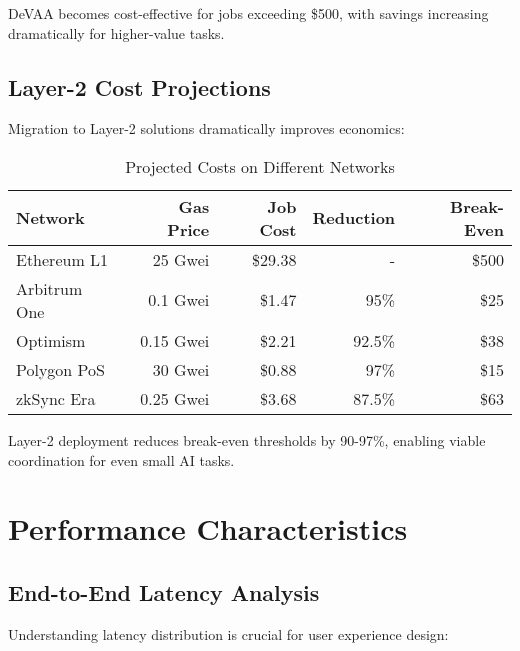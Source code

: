 DeVAA becomes cost-effective for jobs exceeding \$500, with savings increasing dramatically for higher-value tasks.

\subsection{Layer-2 Cost Projections}

Migration to Layer-2 solutions dramatically improves economics:

\begin{table}[h]
\centering
\caption{Projected Costs on Different Networks}
\label{tab:l2-costs}
\begin{tabular}{lrrrr}
\toprule
\textbf{Network} & \textbf{Gas Price} & \textbf{Job Cost} & \textbf{Reduction} & \textbf{Break-Even} \\
\midrule
Ethereum L1 & 25 Gwei & \$29.38 & - & \$500 \\
Arbitrum One & 0.1 Gwei & \$1.47 & 95\% & \$25 \\
Optimism & 0.15 Gwei & \$2.21 & 92.5\% & \$38 \\
Polygon PoS & 30 Gwei & \$0.88 & 97\% & \$15 \\
zkSync Era & 0.25 Gwei & \$3.68 & 87.5\% & \$63 \\
\bottomrule
\end{tabular}
\end{table}

Layer-2 deployment reduces break-even thresholds by 90-97\%, enabling viable coordination for even small AI tasks.

\section{Performance Characteristics}

\subsection{End-to-End Latency Analysis}

Understanding latency distribution is crucial for user experience design:

